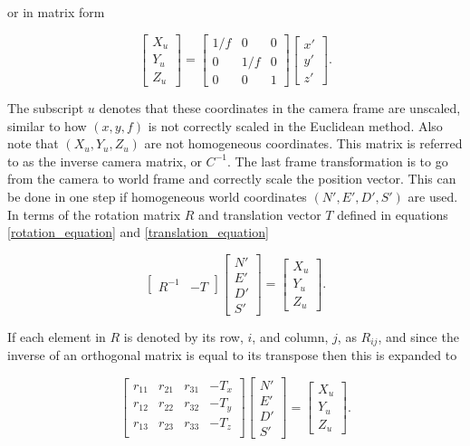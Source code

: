   or in matrix form
  
   \[
   \begin{bmatrix} X_u \\ Y_u \\ Z_u \end{bmatrix}
   =
   \begin{bmatrix} 
       1/f &   0   &  0 \\ 
       0   &  1/f  &  0 \\
       0   &   0   &  1  
   \end{bmatrix}
   \begin{bmatrix} x' \\ y' \\ z' \end{bmatrix}
   .
   \]
   
  The subscript $u$ denotes that these coordinates in the camera frame are unscaled, similar to how $(x,y,f)$ is not correctly scaled in the Euclidean method.  Also note that $(X_u, Y_u, Z_u)$ are not homogeneous coordinates.  This matrix is referred to as the inverse camera matrix, or $C^{-1}$.   The last frame transformation is to go from the camera to world frame and correctly scale the position vector.  This can be done in one step if homogeneous world coordinates $(N',E',D',S')$ are used.  In terms of the rotation matrix $R$ and translation vector $T$ defined in equations \ref{rotation_equation} and \ref{translation_equation}  
  
     \[
     \begin{bmatrix} R^{-1} & -T \end{bmatrix}
     \begin{bmatrix} N' \\ E' \\ D' \\ S' \end{bmatrix}
     =
     \begin{bmatrix} X_u \\ Y_u \\ Z_u \end{bmatrix}
     .
     \]
     
 If each element in $R$ is denoted by its row, $i$, and column, $j$, as $R_{ij}$, and since the inverse of an orthogonal matrix is equal to its transpose then this is expanded to
 
      \[
      \begin{bmatrix} r_{11} & r_{21} & r_{31} & -T_x \\
                      r_{12} & r_{22} & r_{32} & -T_y \\
                      r_{13} & r_{23} & r_{33} & -T_z \\
      \end{bmatrix}
      \begin{bmatrix} N' \\ E' \\ D' \\ S' \end{bmatrix}
      =
      \begin{bmatrix} X_u \\ Y_u \\ Z_u \end{bmatrix}
      .
      \]
      
